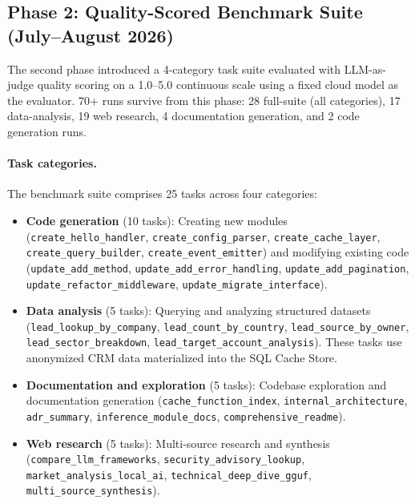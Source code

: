 \documentclass{article}
\begin{document}
\subsection{Phase 2: Quality-Scored Benchmark Suite (July--August 2026)}
\label{sec:eval_phase2}

The second phase introduced a 4-category task suite evaluated with LLM-as-judge quality scoring on a 1.0--5.0 continuous scale using a fixed cloud model as the evaluator.
70+ runs survive from this phase: 28 full-suite (all categories), 17 data-analysis, 19 web research, 4 documentation generation, and 2 code generation runs.

\paragraph{Task categories.}
The benchmark suite comprises 25 tasks across four categories:

\begin{itemize}[leftmargin=*]
\item \textbf{Code generation} (10 tasks): Creating new modules (\texttt{create\_hello\_handler}, \texttt{create\_config\_parser}, \texttt{create\_cache\_layer}, \texttt{create\_query\_builder}, \texttt{create\_event\_emitter}) and modifying existing code (\texttt{update\_add\_method}, \texttt{update\_add\_error\_handling}, \texttt{update\_add\_pagination}, \texttt{update\_refactor\_middleware}, \texttt{update\_migrate\_interface}).

\item \textbf{Data analysis} (5 tasks): Querying and analyzing structured datasets (\texttt{lead\_lookup\_by\_company}, \texttt{lead\_count\_by\_country}, \texttt{lead\_source\_by\_owner}, \texttt{lead\_sector\_breakdown}, \texttt{lead\_target\_account\_analysis}). These tasks use anonymized CRM data materialized into the SQL Cache Store.

\item \textbf{Documentation and exploration} (5 tasks): Codebase exploration and documentation generation (\texttt{cache\_function\_index}, \texttt{internal\_architecture}, \texttt{adr\_summary}, \texttt{inference\_module\_docs}, \texttt{comprehensive\_readme}).

\item \textbf{Web research} (5 tasks): Multi-source research and synthesis (\texttt{compare\_llm\_frameworks}, \texttt{security\_advisory\_lookup}, \texttt{market\_analysis\_local\_ai}, \texttt{technical\_deep\_dive\_gguf}, \texttt{multi\_source\_synthesis}).
\end{itemize}
\end{document}
